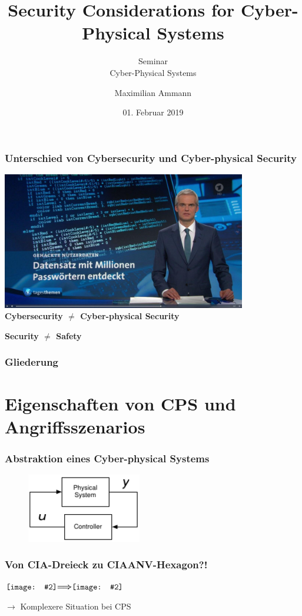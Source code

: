 \documentclass{sikslides}
\title[Security Considerations for CPS]{Security Considerations for Cyber-Physical Systems}
\subtitle{Seminar \\Cyber-Physical Systems} %
\author{Maximilian Ammann}
\date[01.02.2019]{01. Februar 2019}
\newcommand*{\vcenterimage}[2]{\vcenter{\hbox{\texttt{[image: \#2]}}}}
\newcommand*{\vcenterarrow}{\vcenter{\hbox{$\bm{\Longrightarrow}$}}}
\begin{document}
    \titleframe

    \begin{frame}
        \frametitle{Unterschied von Cybersecurity und Cyber-physical Security}
        \centering
        \includegraphics[height=6cm]{figure/cyberattack.jpg}
        \textbf{Cybersecurity $\neq$ Cyber-physical Security}

        \textbf{Security $\neq$ Safety}
    \end{frame}

    \begin{frame}
        \frametitle{Gliederung}
    \end{frame}

    \section{Eigenschaften von CPS und Angriffsszenarios}

    \begin{frame}[label=abstrakt]
        \frametitle{Abstraktion eines Cyber-physical Systems}
        \begin{figure}
            \centering
            \includegraphics[width=5cm]{../figure/abstrakt}
            \label{fig:abstrakt}
        \end{figure}
    \end{frame}

    \begin{frame}
        \frametitle{Von CIA-Dreieck zu CIAANV-Hexagon?!}
        \centering
        $\vcenterimage{2.5cm}{../figure/cia}\vcenterarrow\vcenterimage{3.5cm}{../figure/triad}$

        \vspace{40px}
        $\rightarrow$ Komplexere Situation bei CPS
    \end{frame}
\end{document}
